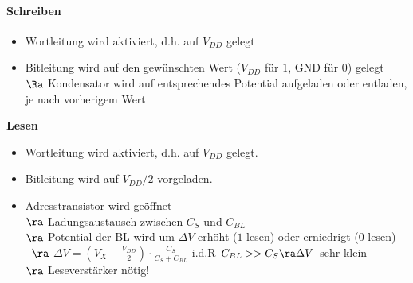 \documentclass[6pt,a4paper]{scrartcl}
\begin{document}
\begin{multicols}{3}
{{	\paragraph{Schreiben}
		\begin{itemize}\itemsep0pt
			\item Wortleitung wird aktiviert, d.h. auf $V_{DD}$ gelegt
			\item Bitleitung wird auf den gewünschten Wert ($V_{DD}$ für $1$, GND für $0$) gelegt \\
			$\Ra$ Kondensator wird auf entsprechendes Potential aufgeladen oder entladen, je nach vorherigem Wert
		\end{itemize}
	}
	\textbf{Lesen}
	\begin{itemize}\itemsep0pt
		\item Wortleitung wird aktiviert, d.h. auf $V_{DD}$ gelegt. 
		\item Bitleitung wird auf $V_{DD} / 2$ vorgeladen.
		\item Adresstransistor wird geöffnet \\
		$\ra$ Ladungsaustausch zwischen $C_S$ und $C_{BL}$ \\
		$\ra$ Potential der BL wird um $\Delta V$ erhöht ($1$ lesen) oder erniedrigt ($0$ lesen) \\\
		$\ra$ $\Delta V = \left(V_X - \frac{V_{DD}}{2}\right) \cdot \frac{C_S}{C_S + C_{BL}}$ \quad i.d.R $C_{BL} >> C_S \ra \Delta V$ sehr klein \\
		$\ra $ Leseverstärker nötig!
	\end{itemize}
}

\begin{multicols}{2}	


\end{multicols}


\end{multicols}
\end{document}
